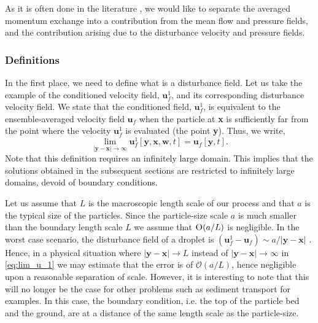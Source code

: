 As it is often done in the literature \citep{zhang1994ensemble,jackson2000,wang2021numerical,wang2024effect}, we would like to separate the averaged momentum exchange into a contribution from the mean flow and pressure fields, and the contribution arising due to the disturbance velocity and pressure fields.  

\subsubsection{Definitions}

In the first place, we need to define what is a disturbance field.
Let us take the example of the conditioned velocity field, $\textbf{u}_f^1$, and its corresponding disturbance velocity field.
We state that the conditioned field, $\textbf{u}_f^1$, is equivalent to the ensemble-averaged velocity field $\textbf{u}_f$ when the particle at \textbf{x} is sufficiently far from the point where the velocity $\textbf{u}_f^1$ is evaluated (the point \textbf{y}).
Thus, we write,  
\begin{equation}
    \lim_{|\textbf{y}-\textbf{x}|\to\infty} 
    \textbf{u}_f^1[\textbf{y},\textbf{x},\textbf{w},t]
    =
    \textbf{u}_f[\textbf{y},t]. 
    \label{eq:lim_u_1}
\end{equation} 
Note that this definition requires an infinitely large domain. 
This implies that the solutions obtained in the subsequent sections are restricted to infinitely large domains, devoid of boundary conditions.

Let us assume that $L$ is the macroscopic length scale of our process and that $a$  is the typical size of the particles.
Since the particle-size scale $a$ is much smaller than the boundary length scale $L$ we assume that $\textsc{O}(a/L)$ is negligible. 
In the worst case scenario, the disturbance field of a droplet is $(\textbf{u}_f^1- \textbf{u}_f)\sim a/|\textbf{y}-\textbf{x}|$ \citet{kim2013microhydrodynamics}.
Hence, in a physical situation where $|\textbf{y}-\textbf{x}|\to L$ instead of $|\textbf{y}-\textbf{x}|\to\infty$ in \ref{eq:lim_u_1} we may estimate that the error is of $\mathcal{O}(a/L)$, hence negligible upon a reasonable separation of scale.
However, it is interesting to note that this will no longer be the case for other problems such as sediment transport for examples.
In this case, the boundary condition, i.e. the top of the particle bed and the ground, are at a distance of the same length scale as the particle-size. 

